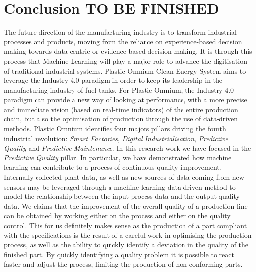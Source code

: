 \chapter*{Conclusion TO BE FINISHED}
\thispagestyle{empty}

The future direction of the manufacturing industry is to transform industrial processes and products, moving from the reliance on experience-based decision making towards data-centric or evidence-based decision making. It is through this process that Machine Learning will play a major role to advance the digitisation of traditional industrial systems. Plastic Omnium Clean Energy System aims to leverage the Industry 4.0 paradigm in order to keep its leadership in the manufacturing industry of fuel tanks. For Plastic Omnium, the Industry 4.0 paradigm can provide a new way of looking at performance, with a more precise and immediate vision (based on real-time indicators) of the entire production chain, but also the optimisation of production through the use of data-driven methods. Plastic Omnium identifies four majors pillars driving the fourth industrial revolution: \textit{Smart Factories}, \textit{Digital Industrialisation}, \textit{Predictive Quality} and \textit{Predictive Maintenance}. In this research work we have focused in the \textit{Predictive Quality} pillar. In particular, we have demonstrated how machine learning can contribute to a process of continuous quality improvement. Internally collected plant data, as well as new sources of data coming from new sensors may be leveraged through a machine learning data-driven method to model the relationship between the input process data and the output quality data. We claims that the improvement of the overall quality of a production line can be obtained by working either on the process and either on the quality control. This for us definitely makes sense as the production of a part compliant with the specifications is the result of a careful work in optimising the production process, as well as the ability to quickly identify a deviation in the quality of the finished part. By quickly identifying a quality problem it is possible to react faster and adjust the process, limiting the production of non-conforming parts.
